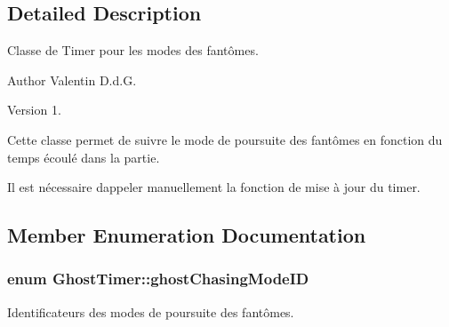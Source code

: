 \subsection{Detailed Description}
Classe de Timer pour les modes des fantômes. 

\begin{DoxyAuthor}{Author}
Valentin D.\+d.\+G. 
\end{DoxyAuthor}
\begin{DoxyVersion}{Version}
1.
\end{DoxyVersion}
Cette classe permet de suivre le mode de poursuite des fantômes en fonction du temps écoulé dans la partie.

Il est nécessaire d\textquotesingle{}appeler manuellement la fonction de mise à jour du timer. 

\subsection{Member Enumeration Documentation}
\hypertarget{class_ghost_timer_ab0d7214f12a7a296873f7066da0dd376}{}
\subsubsection[{ghost\+Chasing\+Mode\+I\+D}]{\setlength{\rightskip}{0pt plus 5cm}enum {\bf Ghost\+Timer\+::ghost\+Chasing\+Mode\+I\+D}}\label{class_ghost_timer_ab0d7214f12a7a296873f7066da0dd376}


Identificateurs des modes de poursuite des fantômes. 

